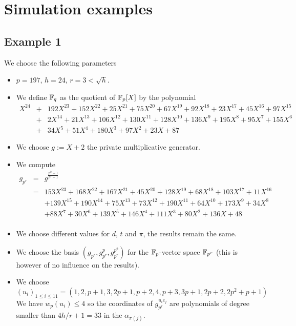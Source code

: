 \documentclass[a4paper]{article}
\begin{document}


\newpage
\appendix

\section{Simulation examples}

\subsection{Example 1}
\label{Ex:1}

We choose the following parameters
\begin{itemize}
\item $p = 197$, $h = 24$, $r = 3 < \sqrt{h}$.
\item We define $\mathbb{F}_q$ as the quotient of $\mathbb{F}_p[X]$ by the polynomial
\begin{eqnarray*}
X^{24} &+& 192X^{23} + 152X^{22} + 25X^{21} + 75X^{20} + 67X^{19} + 92X^{18} + 23X^{17} + 45X^{16} + 97X^{15} \\
 &+& 2X^{14} + 21X^{13} + 106X^{12} + 130X^{11} + 128X^{10} + 136X^9 + 195X^8 + 95X^7 + 155X^6 \\
 &+& 34X^5 + 51X^4 + 180X^3 + 97X^2 + 23X + 87
\end{eqnarray*}
\item We choose $g := X + 2$ the private multiplicative generator.
\item We compute
\begin{eqnarray*}
g_{p^r} &=& g^{\frac{p^h-1}{p^r-1}} \\
&=& 153X^{23} + 168X^{22} + 167X^{21} + 45X^{20} + 128X^{19} + 68X^{18} + 103X^{17} + 11X^{16}\\
&&+ 139X^{15} + 190X^{14} + 75X^{13} + 73X^{12} + 190X^{11} + 64X^{10} + 173X^9 + 34X^8 \\
&&+ 88X^7 + 30X^6 + 139X^5 + 146X^4 + 111X^3 + 80X^2 + 136X + 48\\
\end{eqnarray*}
\item We choose different values for $d$, $t$ and $\pi$, the results remain the same.
\item We choose the basis $\left(g_{p^r}, g_{p^r}^p, g_{p^r}^{p^2} \right)$ for the $\mathbb{F}_p$-vector space $\mathbb{F}_{p^r}$ (this is however of no influence on the results).
\item We choose $(u_i)_{1\leq  i \leq 11} = (1,2,p+1,3,2p+1,p+2,4,p+3,3p+1,2p+2,2p^2+p+1)$\\
We have $w_p(u_i) \leq 4$ so the coordinates of $g_{p^r}^{u_i c_j}$ are polynomials of degree smaller than $4 h/r+1 = 33$ in the $\alpha_{\pi(j)}$.
\end{itemize}
\end{document}
